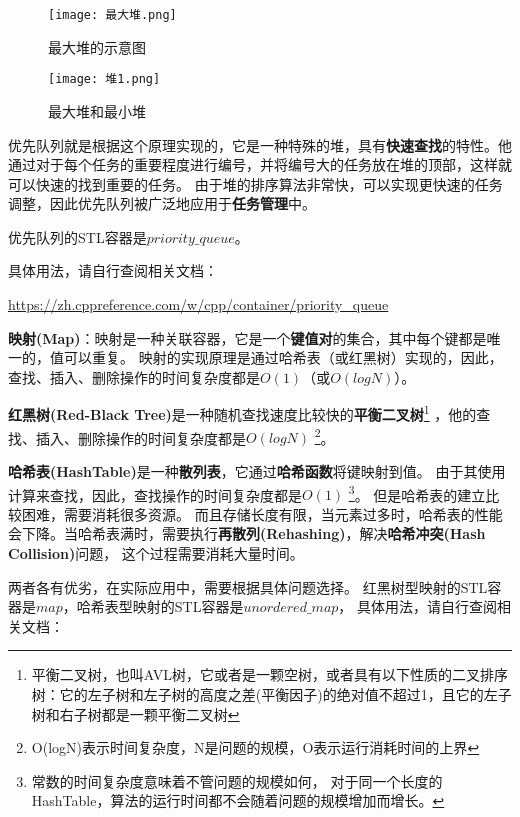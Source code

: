 \begin{figure}[H]
    \centering
    \texttt{[image: 最大堆.png]}
    \caption{最大堆的示意图} %
    \label{fig:最大堆} %
\end{figure}

\begin{figure}[H]
    \centering
    \texttt{[image: 堆1.png]}
    \caption{最大堆和最小堆} %
    \label{fig:最大堆和最小堆} %
\end{figure}

优先队列就是根据这个原理实现的，它是一种特殊的堆，具有\textbf{快速查找}的特性。他通过对于每个任务的重要程度进行编号，并将编号大的任务放在堆的顶部，这样就可以快速的找到重要的任务。
由于堆的排序算法非常快，可以实现更快速的任务调整，因此优先队列被广泛地应用于\textbf{任务管理}中。

优先队列的STL容器是$priority\_queue$。

具体用法，请自行查阅相关文档：

\url{https://zh.cppreference.com/w/cpp/container/priority_queue}

\textbf{映射(Map)}：映射是一种关联容器，它是一个\textbf{键值对}的集合，其中每个键都是唯一的，值可以重复。
映射的实现原理是通过哈希表（或红黑树）实现的，因此，查找、插入、删除操作的时间复杂度都是$O(1)$（或$O(logN)$）。

\textbf{红黑树(Red-Black Tree)}是一种随机查找速度比较快的\textbf{平衡二叉树}\footnote{
    平衡二叉树，也叫AVL树，它或者是一颗空树，或者具有以下性质的二叉排序树：它的左子树和左子树的高度之差(平衡因子)的绝对值不超过1，且它的左子树和右子树都是一颗平衡二叉树}
，他的查找、插入、删除操作的时间复杂度都是$O(logN)$ \footnote{
    O(logN)表示时间复杂度，N是问题的规模，O表示运行消耗时间的上界
}。

\textbf{哈希表(HashTable)}是一种\textbf{散列表}，它通过\textbf{哈希函数}将键映射到值。
由于其使用计算来查找，因此，查找操作的时间复杂度都是$O(1)$
\footnote{常数的时间复杂度意味着不管问题的规模如何，
对于同一个长度的HashTable，算法的运行时间都不会随着问题的规模增加而增长。}。
但是哈希表的建立比较困难，需要消耗很多资源。
而且存储长度有限，当元素过多时，哈希表的性能会下降。当哈希表满时，需要执行\textbf{再散列(Rehashing)}，解决\textbf{哈希冲突(Hash Collision)}问题，
这个过程需要消耗大量时间。

两者各有优劣，在实际应用中，需要根据具体问题选择。
红黑树型映射的STL容器是$map$，哈希表型映射的STL容器是$unordered\_map$，
具体用法，请自行查阅相关文档：

